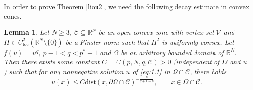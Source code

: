 \documentclass[12pt]{amsart}
\newtheorem{lem}[thm]{Lemma}
\theoremstyle{definition}
\theoremstyle{remark}
\theoremstyle{conclusion}
\theoremstyle{conjecture}
\numberwithin{equation}{section}
\begin{document}
In order to prove Theorem \ref{liou2}, we need the following decay estimate in convex cones.
\begin{lem}\label{decay}
Let $N\geq3$, $\mathcal{C}\subseteq\mathbb{R}^{N}$ be an open convex cone with vertex set $\mathcal{V}$ and $H\in C^{2}_{\text{loc}}(\mathbb{R}^{N}\setminus\{0\})$ be a Finsler norm such that $H^{2}$ is uniformly convex. Let $f(u)=u^{q}$, $p-1<q<p^*-1$ and $\Omega$ be an arbitrary bounded domain of $\mathbb{R}^N$. Then there exists some constant $C=C(p,N,q,\mathcal{C})>0$ (independent of $\Omega$ and $u$) such that for
any nonnegative solution $u$ of \eqref{eq:1.1} in $\Omega\cap\mathcal{C}$, there holds
\begin{equation}\label{eq decay}
  u(x)\leq C\mathrm{dist}(x,\partial\Omega\cap\mathcal{C})^{-\frac{p}{q+1-p}},\qquad x\in\Omega\cap\mathcal{C}.
\end{equation}
\end{lem}
\end{document}
